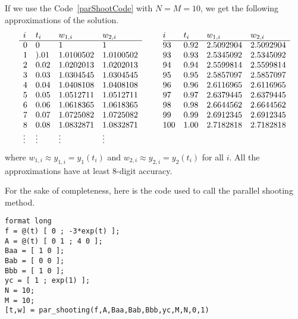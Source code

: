 \begin{egg}
If we use the Code~\ref{parShootCode} with $N = M = 10$, we get the
following approximations of the solution.
\[
\begin{array}{llllc@{\hspace{2em}}llll}
  i & t_i & w_{1,i} & w_{2,i} & & i & t_i & w_{1,i} & w_{2,i} \\
  \cline{1-4} \cline{6-9}
0 & 0 & 1 & 1 && 93 & 0.92 & 2.5092904 & 2.5092904 \\
1 & ).01 & 1.0100502 & 1.0100502 && 93 & 0.93 & 2.5345092 & 2.5345092 \\
2 & 0.02 & 1.0202013 & 1.0202013 && 94 & 0.94 & 2.5599814 & 2.5599814 \\
3 & 0.03 & 1.0304545 & 1.0304545 && 95 & 0.95 & 2.5857097 & 2.5857097 \\
4 & 0.04 & 1.0408108 & 1.0408108 && 96 & 0.96 & 2.6116965 & 2.6116965 \\
5 & 0.05 & 1.0512711 & 1.0512711 && 97 & 0.97 & 2.6379445 & 2.6379445 \\
6 & 0.06 & 1.0618365 & 1.0618365 && 98 & 0.98 & 2.6644562 & 2.6644562 \\
7 & 0.07 & 1.0725082 & 1.0725082 && 99 & 0.99 & 2.6912345 & 2.6912345 \\
8 & 0.08 & 1.0832871 & 1.0832871 && 100 & 1.00 & 2.7182818 & 2.7182818 \\
\vdots & \vdots & \vdots & \vdots && & & &
\end{array}
\]
where $w_{1,i} \approx y_{1,i} = y_1(t_i)$ and
$w_{2,i} \approx y_{2,i} = y_2(t_i)$ for all $i$.
All the approximations have at least $8$-digit accuracy.

For the sake of completeness, here is the code used to call the
parallel shooting method.
\begin{code}
\small
\begin{verbatim}
format long
f = @(t) [ 0 ; -3*exp(t) ];
A = @(t) [ 0 1 ; 4 0 ];
Baa = [ 1 0 ];
Bab = [ 0 0 ];
Bbb = [ 1 0 ];
yc = [ 1 ; exp(1) ];
N = 10;
M = 10; 
[t,w] = par_shooting(f,A,Baa,Bab,Bbb,yc,M,N,0,1)
\end{verbatim}
\end{code}
\end{egg}

